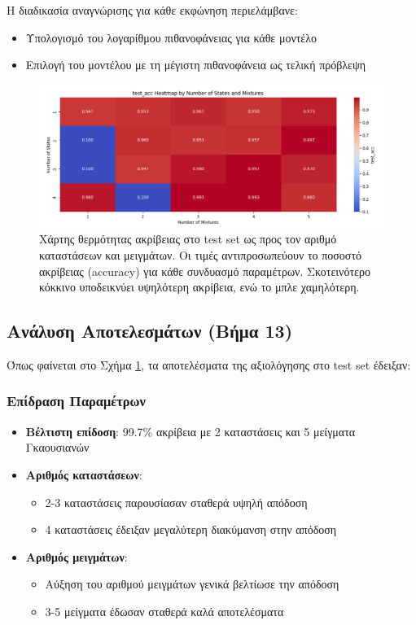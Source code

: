 \documentclass[a4paper,12pt]{article}
\begin{document}
Η διαδικασία αναγνώρισης για κάθε εκφώνηση περιελάμβανε:
\begin{itemize}
    \item Υπολογισμό του λογαρίθμου πιθανοφάνειας για κάθε μοντέλο
    \item Επιλογή του μοντέλου με τη μέγιστη πιθανοφάνεια ως τελική πρόβλεψη
\end{itemize}

\begin{figure}[h]
    \centering
    \includegraphics[width=\textwidth]{hmm_test_acc_heatmap.png}
    \caption{Χάρτης θερμότητας ακρίβειας στο test set ως προς τον αριθμό καταστάσεων και μειγμάτων. 
    Οι τιμές αντιπροσωπεύουν το ποσοστό ακρίβειας (accuracy) για κάθε συνδυασμό παραμέτρων. 
    Σκοτεινότερο κόκκινο υποδεικνύει υψηλότερη ακρίβεια, ενώ το μπλε χαμηλότερη.}
    \label{fig:test_acc_heatmap}
\end{figure}

\subsection*{Ανάλυση Αποτελεσμάτων (Βήμα 13)}
Όπως φαίνεται στο Σχήμα \ref{fig:test_acc_heatmap}, τα αποτελέσματα της αξιολόγησης στο test set έδειξαν:

\subsubsection*{Επίδραση Παραμέτρων}
\begin{itemize}
    \item \textbf{Βέλτιστη επίδοση}: 99.7\% ακρίβεια με 2 καταστάσεις και 5 μείγματα Γκαουσιανών
    \item \textbf{Αριθμός καταστάσεων}:
          \begin{itemize}
              \item 2-3 καταστάσεις παρουσίασαν σταθερά υψηλή απόδοση
              \item 4 καταστάσεις έδειξαν μεγαλύτερη διακύμανση στην απόδοση
          \end{itemize}
    \item \textbf{Αριθμός μειγμάτων}:
          \begin{itemize}
              \item Αύξηση του αριθμού μειγμάτων γενικά βελτίωσε την απόδοση
              \item 3-5 μείγματα έδωσαν σταθερά καλά αποτελέσματα
          \end{itemize}
\end{itemize}
\end{document}
